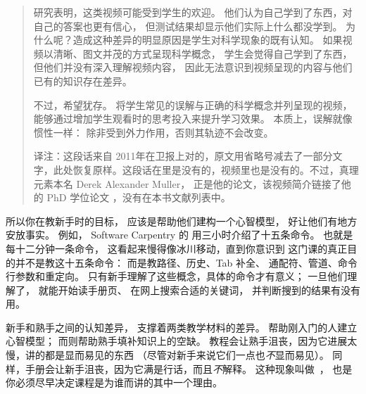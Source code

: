 \begin{quote}

  研究表明，这类视频可能受到学生的欢迎。
  他们认为自己学到了东西，对自己的答案也更有信心，
  但测试结果却显示他们实际上什么都没学到。
  为什么呢？造成这种差异的明显原因是学生对科学现象的既有认知。
  如果视频以清晰、图文并茂的方式呈现科学概念，
  学生会觉得自己学到了东西，但他们并没有深入理解视频内容，
  因此无法意识到视频呈现的内容与他们已有的知识存在差异。

  不过，希望犹存。
  将学生常见的误解与正确的科学概念并列呈现的视频，
  能够通过增加学生观看时的思考投入来提升学习效果。
  本质上，误解就像惯性一样：
  除非受到外力作用，否则其轨迹不会改变。

  译注：这段话来自  2011年在卫报上对的，原文用省略号减去了一部分文字，此处恢复原样。这段话在\cite{Mull2007a}里是没有的，视频里也是没有的。不过，真理元素本名 Derek Alexander Muller，\cite{Mull2007a} 正是他的论文，该视频简介链接了他的 PhD 学位论文 ，没有在本书文献列表中。

\end{quote}

所以你在教新手时的目标，
应该是帮助他们建构一个心智模型，
好让他们有地方安放事实。
例如，
Software Carpentry 的
用三小时介绍了十五条命令。
也就是每十二分钟一条命令，
这看起来慢得像冰川移动，直到你意识到
这门课的真正目的并不是教这十五条命令：
而是教路径、历史、Tab 补全、
通配符、管道、命令行参数和重定向。
只有新手理解了这些概念，具体的命令才有意义；
一旦他们理解了，
就能开始读手册页、
在网上搜索合适的关键词，
并判断搜到的结果有没有用。

新手和熟手之间的认知差异，
支撑着两类教学材料的差异。
帮助刚入门的人建立心智模型；
而则帮助熟手填补知识上的空缺。
教程会让熟手沮丧，因为它进展太慢，讲的都是显而易见的东西
（尽管对新手来说它们一点也\emph{不}显而易见）。
同样，手册会让新手沮丧，因为它满是行话，而且\emph{不}解释。
这种现象叫做~\cite{Kaly2003}，
也是你必须尽早决定课程是为谁而讲的其中一个理由。

